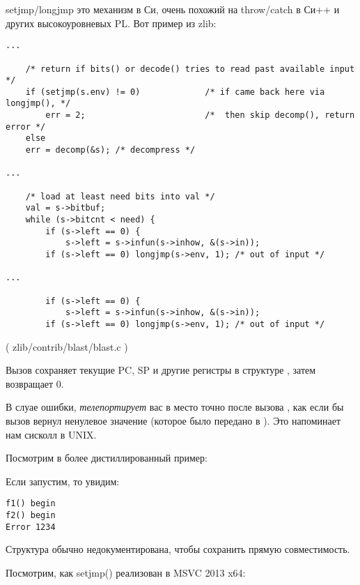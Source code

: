 

setjmp/longjmp это механизм в Си, очень похожий на throw/catch в Си++ и других высокоуровневых \ac{PL}.
Вот пример из zlib:

\begin{lstlisting}[style=customc]
...

    /* return if bits() or decode() tries to read past available input */
    if (setjmp(s.env) != 0)             /* if came back here via longjmp(), */
        err = 2;                        /*  then skip decomp(), return error */
    else
	err = decomp(&s); /* decompress */

...

    /* load at least need bits into val */
    val = s->bitbuf;
    while (s->bitcnt < need) {
        if (s->left == 0) {
            s->left = s->infun(s->inhow, &(s->in));
	    if (s->left == 0) longjmp(s->env, 1); /* out of input */

...

        if (s->left == 0) {
            s->left = s->infun(s->inhow, &(s->in));
	    if (s->left == 0) longjmp(s->env, 1); /* out of input */
\end{lstlisting}
( zlib/contrib/blast/blast.c )

Вызов  сохраняет текущие \ac{PC}, \ac{SP} и другие регистры в структуре , затем возвращает 0.

В слуае ошибки,  \emph{телепортирует} вас в место точно после вызова ,
как если бы вызов  вернул ненулевое значение (которое было передано в ).
Это напоминает нам сисколл  в UNIX.

Посмотрим в более дистиллированный пример:



Если запустим, то увидим:

\begin{lstlisting}
f1() begin
f2() begin
Error 1234
\end{lstlisting}

Структура  обычно недокументирована, чтобы сохранить прямую совместимость.

Посмотрим, как setjmp() реализован в MSVC 2013 x64:



